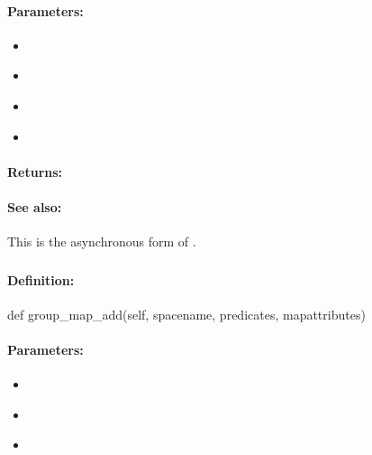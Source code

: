 \paragraph{Parameters:}
\begin{itemize}[noitemsep]
\item {}\\

\item {}\\

\item {}\\

\item {}\\

\end{itemize}

\paragraph{Returns:}


\paragraph{See also:}  This is the asynchronous form of .

\pagebreak
\subsubsection{}
\label{api:python:group_map_add}


\paragraph{Definition:}
\begin{pythoncode}
def group_map_add(self, spacename, predicates, mapattributes)
\end{pythoncode}

\paragraph{Parameters:}
\begin{itemize}[noitemsep]
\item {}\\

\item {}\\

\item {}\\

\end{itemize}

